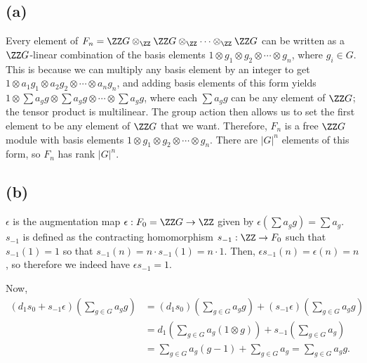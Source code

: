 \documentclass[12pt, reqno]{amsart}
\begin{document}
\subsection*{(a)}

Every element of 
$F_n = \ZZ G \otimes_\ZZ \ZZ G \otimes_\ZZ \cdots \otimes_\ZZ \ZZ G$ can be
written as a $\ZZ G$-linear combination of the basis elements
$1 \otimes g_1 \otimes g_2 \otimes \cdots \otimes g_n$, where $g_i \in G$. This
is because we can multiply any basis element by an integer to get
$1 \otimes a_1 g_1 \otimes a_2 g_2 \otimes \cdots \otimes a_n g_n$, and adding
basis elements of this form yields $1 \otimes \sum a_g g \otimes \sum a_g g
\otimes \cdots
\otimes \sum a_g g$, where each $\sum a_g g$ can be any element of $\ZZ G$; the tensor product is
multilinear. The group action then allows us to set the first element to be any
element of $\ZZ G$ that we want. Therefore, $F_n$ is a free $\ZZ G$ module with
basis elements $1 \otimes g_1 \otimes g_2 \otimes \cdots \otimes g_n$. There
are $|G|^n$ elements of this form, so $F_n$ has rank $|G|^n$.

\subsection*{(b)}

\def\e{\epsilon}

$\e$ is the augmentation map $\e : F_0 = \ZZ G \to \ZZ$ given by 
$\e (\sum a_g g) = \sum a_g$. 
$s_{-1}$ is defined as the contracting homomorphism $s_{-1} : \ZZ \to F_0$ such
that $s_{-1}(1) = 1$ so that $s_{-1}(n) = n \cdot s_{-1}(1) = n \cdot 1$. Then, 
$\e s_{-1} (n) = \e(n) = n$, so therefore we indeed have $\e s_{-1} = 1$. 

Now, 
\begin{align*}
(d_1 s_0 + s_{-1} \e)\left(\sum_{g \in G} a_g g\right) 
&= (d_1 s_0) \left(\sum_{g \in G} a_g g\right) 
	+ (s_{-1} \e) \left(\sum_{g \in G} a_g g\right) \\
&= d_1 \left(\sum_{g \in G} a_g (1 \otimes g)\right) 
	+ s_{-1} \left(\sum_{g \in G} a_g \right)  \\
&= \sum_{g \in G} a_g (g - 1) + \sum_{g \in G} a_g = \sum_{g \in G} a_g g.
\end{align*}
\end{document}
